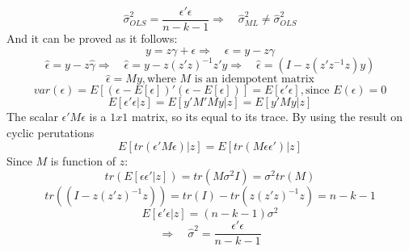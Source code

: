 \documentclass[12pt,onecolumn]{article}
\begin{document}
\begin{enumerate}
\begin{enumerate}
\begin{equation*}
        \end{equation*}
        \begin{equation*}
            \boxed{\hat{\sigma}^2_{OLS}=\frac{\epsilon'\epsilon}{n-k-1}} \Rightarrow \quad \hat{\sigma}^2_{ML}\neq\hat{\sigma}^2_{OLS}
        \end{equation*}
        And it can be proved as it follows:
        \begin{equation*}
            y=z\gamma+\epsilon \Rightarrow \quad \epsilon=y-z\gamma
        \end{equation*}
       \begin{equation*}
           \hat{\epsilon}=y-z\hat{\gamma} \Rightarrow \quad \hat{\epsilon}=y-z(z'z)^{-1}z'y \Rightarrow \quad \hat{\epsilon}=(I-z(z'z^{-1}z)y) 
       \end{equation*}
       \begin{equation*}
           \hat{\epsilon}=My, \text{where $M$ is an idempotent matrix}
       \end{equation*} 
       \begin{equation*}
           var(\epsilon)=E\left[(\epsilon-E[\epsilon])'(\epsilon-E[\epsilon])\right]=E[\epsilon'\epsilon], \text{since $E(\epsilon)=0$}
       \end{equation*}
       \begin{equation*}
           E[\epsilon'\epsilon|z]=E[y'M'My|z]=E[y'My|z]
       \end{equation*}
       The scalar $\epsilon'M\epsilon$ is a $1x1$ matrix, so its equal to its trace. By using the result on cyclic perutations
       \begin{equation*}
           E[tr(\epsilon'M\epsilon)|z]=E[tr(M\epsilon\epsilon')|z]
       \end{equation*}
       Since $M$ is function of $z$:
       \begin{equation*}
           tr\left(E[\epsilon\epsilon'|z]\right)=tr(M\sigma^2I)=\sigma^2tr(M)
       \end{equation*}
       \begin{equation*}
           tr\left((I-z(z'z)^{-1}z)\right)=tr(I)-tr(z(z'z)^{-1}z)=n-k-1
       \end{equation*}
       \begin{equation*}
           E[\epsilon'\epsilon|z]=(n-k-1)\sigma^2
       \end{equation*}
       \begin{equation*}
           \Rightarrow \quad \hat{\sigma}^2=\frac{\epsilon'\epsilon}{n-k-1}
       \end{equation*}

\end{enumerate}
\end{enumerate}
\end{document}
